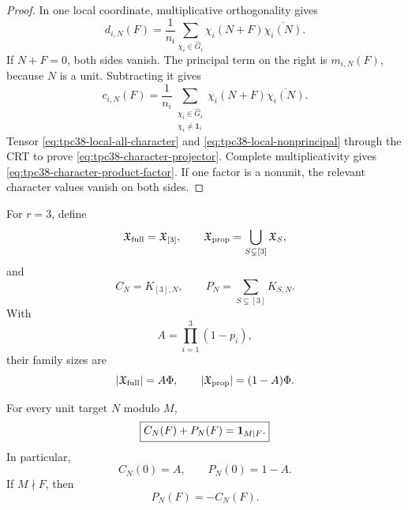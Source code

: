 \begin{proof}
In one local coordinate, multiplicative orthogonality gives
\begin{equation}
 d_{i,N}(F)
 =\frac1{n_i}\sum_{\chi_i\in\widehat G_i}
 \chi_i(N+F)\overline{\chi_i(N)}.
 \label{eq:tpc38-local-all-character}
\end{equation}
If \(N+F=0\), both sides vanish.  The principal term on the right is
\(m_{i,N}(F)\), because \(N\) is a unit.  Subtracting it gives
\begin{equation}
 c_{i,N}(F)
 =\frac1{n_i}\sum_{\substack{\chi_i\in\widehat G_i\\
 \chi_i\ne\mathbf1_i}}
 \chi_i(N+F)\overline{\chi_i(N)}.
 \label{eq:tpc38-local-nonprincipal}
\end{equation}
Tensor \eqref{eq:tpc38-local-all-character} and
\eqref{eq:tpc38-local-nonprincipal} through the CRT to prove
\eqref{eq:tpc38-character-projector}.  Complete multiplicativity gives
\eqref{eq:tpc38-character-product-factor}.  If one factor is a nonunit,
the relevant character values vanish on both sides.
\end{proof}

For \(r=3\), define
\begin{equation}
 \mathfrak X_{\rm full}=\mathfrak X_{[3]},
 \qquad
 \mathfrak X_{\rm prop}
 =\bigcup_{S\subsetneq[3]}\mathfrak X_S,
 \label{eq:tpc38-full-proper-families}
\end{equation}
and
\begin{equation}
 C_N=K_{[3],N},\qquad
 P_N=\sum_{S\subsetneq[3]}K_{S,N}.
 \label{eq:tpc38-full-proper-faces}
\end{equation}
With
\begin{equation}
 A=\prod_{i=1}^3(1-p_i),
 \label{eq:tpc38-A-definition}
\end{equation}
their family sizes are
\begin{equation}
 |\mathfrak X_{\rm full}|=A\Phi,
 \qquad
 |\mathfrak X_{\rm prop}|=(1-A)\Phi.
 \label{eq:tpc38-family-sizes}
\end{equation}

\begin{corollary}
\label{cor:tpc38-face-recombination}
For every unit target \(N\) modulo \(M\),
\begin{equation}
 \boxed{C_N(F)+P_N(F)=\mathbf 1_{M\mid F}.}
 \label{eq:tpc38-face-recombination}
\end{equation}
In particular,
\begin{equation}
 C_N(0)=A,\qquad P_N(0)=1-A.
 \label{eq:tpc38-face-values-zero}
\end{equation}
If \(M\nmid F\), then
\begin{equation}
 P_N(F)=-C_N(F).
 \label{eq:tpc38-offjoint-cancellation}
\end{equation}
\end{corollary}

